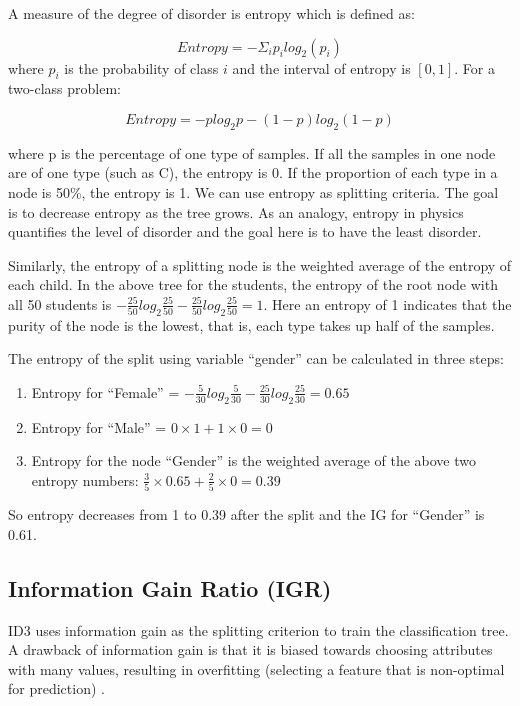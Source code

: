 \documentclass[
  12pt,
]{krantz}
\providecommand{\tightlist}{%
  \setlength{\itemsep}{0pt}\setlength{\parskip}{0pt}}
\begin{document}
A measure of the degree of disorder is entropy which is defined as:

\[Entropy = - \Sigma_i p_i log_2(p_i)\]
where \(p_i\) is the probability of class \(i\) and the interval of entropy is \([0, 1]\). For a two-class problem:

\[Entropy=-plog_{2}p-(1-p)log_{2}(1-p)\]

where p is the percentage of one type of samples. If all the samples in one node are of one type (such as C), the entropy is 0. If the proportion of each type in a node is 50\%, the entropy is 1. We can use entropy as splitting criteria. The goal is to decrease entropy as the tree grows. As an analogy, entropy in physics quantifies the level of disorder and the goal here is to have the least disorder.

Similarly, the entropy of a splitting node is the weighted average of the entropy of each child. In the above tree for the students, the entropy of the root node with all 50 students is \(-\frac{25}{50}log_{2}\frac{25}{50}-\frac{25}{50}log_{2}\frac{25}{50}=1\). Here an entropy of 1 indicates that the purity of the node is the lowest, that is, each type takes up half of the samples.

The entropy of the split using variable ``gender'' can be calculated in three steps:

\begin{enumerate}
\def\labelenumi{\arabic{enumi}.}
\tightlist
\item
  Entropy for ``Female'' = \(-\frac{5}{30}log_{2}\frac{5}{30}-\frac{25}{30}log_{2}\frac{25}{30}=0.65\)
\item
  Entropy for ``Male'' = \(0\times1+1\times 0=0\)
\item
  Entropy for the node ``Gender'' is the weighted average of the above two entropy numbers: \(\frac{3}{5}\times 0.65+\frac{2}{5}\times 0=0.39\)
\end{enumerate}

So entropy decreases from 1 to 0.39 after the split and the IG for ``Gender'' is 0.61.

\hypertarget{information-gain-ratio-igr}{%
\subsection{Information Gain Ratio (IGR)}\label{information-gain-ratio-igr}}

ID3 uses information gain as the splitting criterion to train the classification tree. A drawback of information gain is that it is biased towards choosing attributes with many values, resulting in overfitting (selecting a feature that is non-optimal for prediction) \citep{HSSINA2014}.
\end{document}
